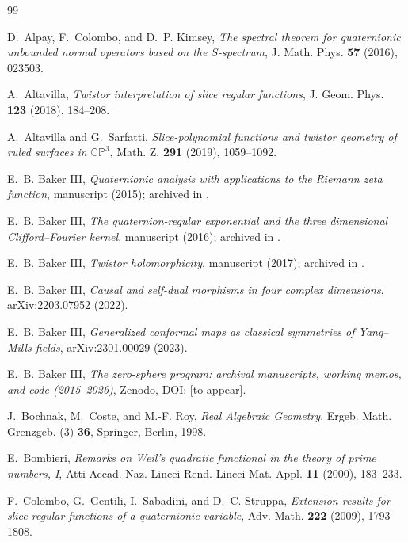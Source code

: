 \documentclass[11pt]{amsart}
\theoremstyle{plain}
\theoremstyle{definition}
\theoremstyle{remark}
\begin{document}
\begin{thebibliography}{99}
\itemsep2pt

D.~Alpay, F.~Colombo, and D.~P. Kimsey,
\emph{The spectral theorem for quaternionic unbounded normal operators based on the $S$-spectrum},
J. Math. Phys. \textbf{57} (2016), 023503.

A.~Altavilla,
\emph{Twistor interpretation of slice regular functions},
J. Geom. Phys. \textbf{123} (2018), 184--208.

A.~Altavilla and G.~Sarfatti,
\emph{Slice-polynomial functions and twistor geometry of ruled surfaces in $\mathbb{CP}^3$},
Math. Z. \textbf{291} (2019), 1059--1092.

E.~B. Baker III,
\emph{Quaternionic analysis with applications to the Riemann zeta function},
manuscript (2015); archived in \cite{ZenodoArchive}.

E.~B. Baker III,
\emph{The quaternion-regular exponential and the three dimensional Clifford--Fourier kernel},
manuscript (2016); archived in \cite{ZenodoArchive}.

E.~B. Baker III,
\emph{Twistor holomorphicity},
manuscript (2017); archived in \cite{ZenodoArchive}.

E.~B. Baker III,
\emph{Causal and self-dual morphisms in four complex dimensions},
arXiv:2203.07952 (2022).

E.~B. Baker III,
\emph{Generalized conformal maps as classical symmetries of Yang--Mills fields},
arXiv:2301.00029 (2023).

E.~B. Baker III,
\emph{The zero-sphere program: archival manuscripts, working memos, and code (2015--2026)},
Zenodo, DOI: [to appear].

J.~Bochnak, M.~Coste, and M.-F. Roy,
\emph{Real Algebraic Geometry},
Ergeb. Math. Grenzgeb. (3) \textbf{36}, Springer, Berlin, 1998.

E.~Bombieri,
\emph{Remarks on Weil's quadratic functional in the theory of prime numbers, I},
Atti Accad. Naz. Lincei Rend. Lincei Mat. Appl. \textbf{11} (2000), 183--233.

F.~Colombo, G.~Gentili, I.~Sabadini, and D.~C. Struppa,
\emph{Extension results for slice regular functions of a quaternionic variable},
Adv. Math. \textbf{222} (2009), 1793--1808.


\end{thebibliography}
\end{document}
